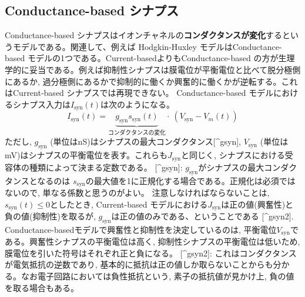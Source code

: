 \subsection{Conductance-based シナプス}
Conductance-based シナプスはイオンチャネルの\textbf{コンダクタンスが変化}するというモデルである。関連して、例えば Hodgkin-Huxley モデルはConductance-based モデルの1つである。Current-basedよりもConductance-based の方が生理学的に妥当である。例えば抑制性シナプスは膜電位が平衡電位と比べて脱分極側にあるか, 過分極側にあるかで抑制的に働くか興奮的に働くかが逆転する。これはCurrent-based シナプスでは再現できない。
Conductance-based モデルにおけるシナプス入力は$I_{\text{syn}}(t)$は次のようになる。 
\begin{equation}
I_{\text{syn}}(t)=\underbrace{g_{\text{syn}}s_{\text{syn}}(t)}_{コンダクタンスの変化}\cdot\ \left(V_{\text{syn}}-V_{m}(t)\right)    
\end{equation}
ただし, $g_{\text{syn}}$ (単位はnS)はシナプスの最大コンダクタンス[^gsyn], $V_{\text{syn}}$ (単位はmV)はシナプスの平衡電位を表す。これらも$J_{\text{syn}}$と同じく, シナプスにおける受容体の種類によって決まる定数である。
[^gsyn]: $g_{\text{syn}}$がシナプスの最大コンダクタンスとなるのは $s_{\text{syn}}$の最大値を1に正規化する場合である。正規化は必須ではないので, 単なる係数と思うのがよい。
注意しなければならないことは, $s_{\text{syn}}(t)\leq 0$としたとき, Current-based モデルにおける$J_{\text{syn}}$は正の値(興奮性)と負の値(抑制性)を取るが, $g_{\text{syn}}$は正の値のみである、ということである [^gsyn2]. Conductance-basedモデルで興奮性と抑制性を決定しているのは, 平衡電位$V_{\text{syn}}$である。興奮性シナプスの平衡電位は高く, 抑制性シナプスの平衡電位は低いため, 膜電位を引いた符号はそれぞれ正と負になる。
[^gsyn2]: これはコンダクタンスが電気抵抗の逆数であり, 基本的に抵抗は正の値しか取らないことからも分かる。なお電子回路においては負性抵抗という,  素子の抵抗値が見かけ上, 負の値を取る場合もある。
